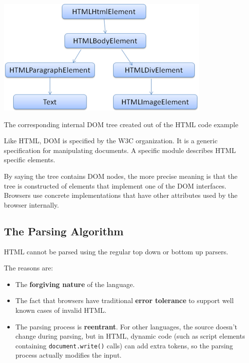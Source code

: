 \documentclass[a4paper, justified, notoc]{tufte-handout} %
\begin{document}
\begin{marginfigure}[-15em]
    \includegraphics{./figures/basic_dom_tree.png}
    \caption{The corresponding internal DOM tree created out of the HTML code example}
    \label{fig:basic_dom_tree}
\end{marginfigure}



Like HTML, DOM is specified by the W3C organization. It is a generic specification for manipulating documents. A specific module describes HTML specific elements.

By saying the tree contains DOM nodes, the more precise meaning is that the tree is constructed of elements that implement one of the DOM interfaces. Browsers use concrete implementations that have other attributes used by the browser internally.


\subsection{The Parsing Algorithm} %
\label{sub:the_parsing_algorithm}

HTML cannot be parsed using the regular top down or bottom up parsers.

The reasons are:
\begin{itemize}
	\item The \textbf{forgiving nature} of the language.
	\item The fact that browsers have traditional \textbf{error tolerance} to support well known cases of invalid HTML.
	\item The parsing process is \textbf{reentrant}. For other languages, the source doesn't change during parsing, but in HTML, dynamic code (such as script elements containing \texttt{document.write()} calls) can add extra tokens, so the parsing process actually modifies the input.
\end{itemize}
\end{document}
